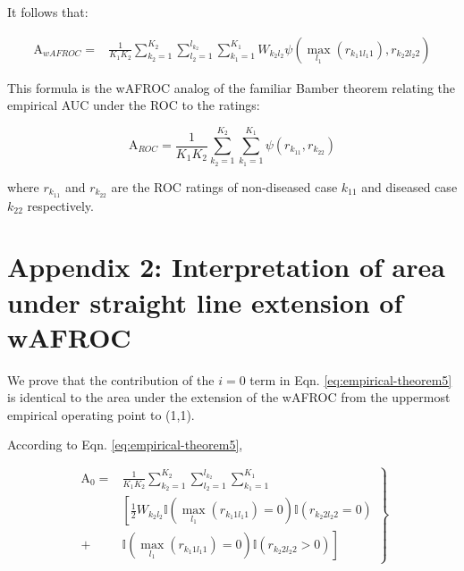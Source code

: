 \documentclass[
]{book}
\begin{document}
It follows that:

\begin{equation}
\begin{aligned}
\text{A}_{wAFROC} =& \frac{1}{K_1K_2}  \sum_{k_2=1}^{K_2} \sum_{l_2=1}^{l_{k_2}}\sum_{k_1=1}^{K_1} W_{k_2l_2} \psi\left ( \max_{l_1} \left ( r_{k_1 1 l_1 1} \right ) , r_{k_2 2 l_2 2} \right )
\end{aligned}
\label{eq:empirical-theorem7}
\end{equation}

This formula is the wAFROC analog of the familiar Bamber theorem \citep{bamber1975area} relating the empirical AUC under the ROC to the ratings:

\begin{equation}
\text{A}_{ROC} = \frac{1}{K_1K_2}  \sum_{k_2=1}^{K_2} \sum_{k_1=1}^{K_1} \psi\left (  r_{k_11} , r_{k_22} \right )
\label{eq:empirical-bamber-theorem}
\end{equation}

where \(r_{k_11}\) and \(r_{k_22}\) are the ROC ratings of non-diseased case \(k_11\) and diseased case \(k_22\) respectively.

\hypertarget{empirical-theorem-2}{%
\section{Appendix 2: Interpretation of area under straight line extension of wAFROC}\label{empirical-theorem-2}}

We prove that the contribution of the \(i = 0\) term in Eqn. \eqref{eq:empirical-theorem5} is identical to the area under the extension of the wAFROC from the uppermost empirical operating point to (1,1).

According to Eqn. \eqref{eq:empirical-theorem5},

\begin{equation}
\left. 
\begin{aligned}
\text{A}_0 =& \frac{1}{K_1K_2}  \sum_{k_2=1}^{K_2} \sum_{l_2=1}^{l_{k_2}}\sum_{k_1=1}^{K_1} \\
&\left [ \frac{1}{2} W_{k_2l_2} \mathbb{I}\left ( \max_{l_1} \left (r_{k_1 1 l_1 1}  \right ) = 0  \right )\mathbb{I}\left ( r_{k_2 2 l_2 2} = 0 \right ) \right. \\
+& \left. \mathbb{I}\left ( \max_{l_1} \left (r_{k_1 1 l_1 1}  \right ) = 0  \right )\mathbb{I}\left ( r_{k_2 2 l_2 2} > 0 \right )  \right ]
\end{aligned}
\right \} 
\label{eq:empirical-theorem8}
\end{equation}
\end{document}
